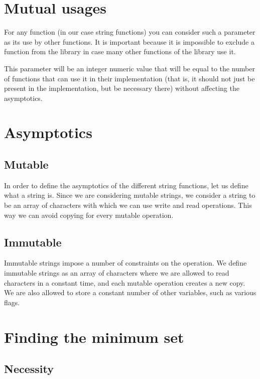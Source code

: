 \documentclass[anonymous,sigplan,review,11pt,nonacm,natbib=false]{acmart}
\begin{document}
    \section{Mutual usages}

    For any function (in our case string functions) you can consider such a parameter as its use by other functions. It is important because it is impossible to exclude a function from the library in case many other functions of the library use it.

    This parameter will be an integer numeric value that will be equal to the number of functions that can use it in their implementation (that is, it should not just be present in the implementation, but be necessary there) without affecting the asymptotics.

    \section{Asymptotics}

    \subsection{Mutable}

    In order to define the asymptotics of the different string functions, let us define what a string is. Since we are considering mutable strings, we consider a string to be an array of characters with which we can use write and read operations. This way we can avoid copying for every mutable operation.

    \subsection{Immutable}

    Immutable strings impose a number of constraints on the operation. We define immutable strings as an array of characters where we are allowed to read characters in a constant time, and each mutable operation creates a new copy. We are also allowed to store a constant number of other variables, such as various flags.

    \section{Finding the minimum set}

    \subsection{Necessity}
\end{document}
